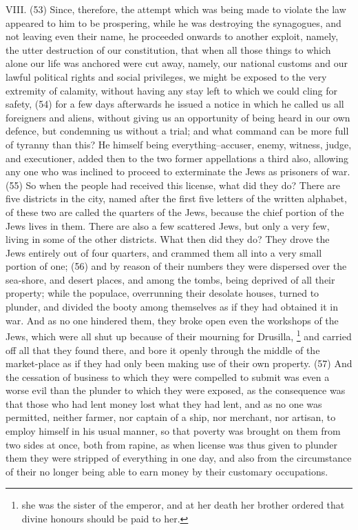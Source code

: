 VIII. (53) Since, therefore, the attempt which was being made to violate the law appeared to him to
be prospering, while he was destroying the synagogues, and not leaving even their name, he
proceeded onwards to another exploit, namely, the utter destruction of our constitution, that when
all those things to which alone our life was anchored were cut away, namely, our national customs
and our lawful political rights and social privileges, we might be exposed to the very extremity of
calamity, without having any stay left to which we could cling for safety, (54) for a few days
afterwards he issued a notice in which he called us all foreigners and aliens, without giving us an
opportunity of being heard in our own defence, but condemning us without a trial; and what
command can be more full of tyranny than this? He himself being everything--accuser, enemy,
witness, judge, and executioner, added then to the two former appellations a third also, allowing any
one who was inclined to proceed to exterminate the Jews as prisoners of war. (55) So when the
people had received this license, what did they do? There are five districts in the city, named after
the first five letters of the written alphabet, of these two are called the quarters of the Jews,
because the chief portion of the Jews lives in them. There are also a few scattered Jews, but only
a very few, living in some of the other districts. What then did they do? They drove the Jews
entirely out of four quarters, and crammed them all into a very small portion of one; (56) and by
reason of their numbers they were dispersed over the sea-shore, and desert places, and among
the tombs, being deprived of all their property; while the populace, overrunning their desolate
houses, turned to plunder, and divided the booty among themselves as if they had obtained it in
war. And as no one hindered them, they broke open even the workshops of the Jews, which were
all shut up because of their mourning for Drusilla, \footnote{she was the sister of the emperor, and at her death her
brother ordered that divine honours should be paid to her.} and carried off all that they found there, and bore it
openly through the middle of the market-place as if they had only been making use of their own
property. (57) And the cessation of business to which they were compelled to submit was even a
worse evil than the plunder to which they were exposed, as the consequence was that those who
had lent money lost what they had lent, and as no one was permitted, neither farmer, nor captain of
a ship, nor merchant, nor artisan, to employ himself in his usual manner, so that poverty was
brought on them from two sides at once, both from rapine, as when license was thus given to
plunder them they were stripped of everything in one day, and also from the circumstance of their
no longer being able to earn money by their customary occupations.

